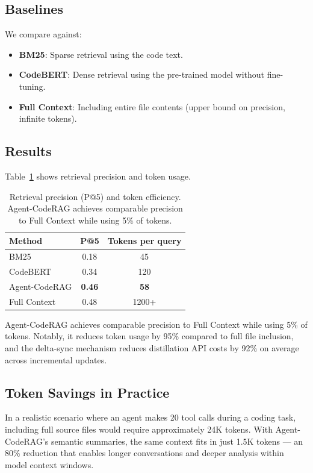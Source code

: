 \documentclass[10pt,twocolumn]{article}
\begin{document}
\subsection{Baselines}

We compare against:
\begin{itemize}
    \item \textbf{BM25}: Sparse retrieval using the code text.
    \item \textbf{CodeBERT}: Dense retrieval using the pre-trained model without fine-tuning.
    \item \textbf{Full Context}: Including entire file contents (upper bound on precision, infinite tokens).
\end{itemize}

\subsection{Results}

Table~\ref{tab:results} shows retrieval precision and token usage.

\begin{table}
    \centering
    \caption{Retrieval precision (P@5) and token efficiency. Agent-CodeRAG achieves comparable precision to Full Context while using 5\% of tokens.}
    \label{tab:results}
    \begin{tabular}{lcc}
        \toprule
        Method & P@5 & Tokens per query \\
        \midrule
        BM25 & 0.18 & 45 \\
        CodeBERT & 0.34 & 120 \\
        Agent-CodeRAG & \textbf{0.46} & \textbf{58} \\
        Full Context & 0.48 & 1200+ \\
        \bottomrule
    \end{tabular}
\end{table}

Agent-CodeRAG achieves comparable precision to Full Context while using 5\% of tokens. Notably, it reduces token usage by 95\% compared to full file inclusion, and the delta-sync mechanism reduces distillation API costs by 92\% on average across incremental updates.

\subsection{Token Savings in Practice}

In a realistic scenario where an agent makes 20 tool calls during a coding task, including full source files would require approximately 24K tokens. With Agent-CodeRAG's semantic summaries, the same context fits in just 1.5K tokens — an 80\% reduction that enables longer conversations and deeper analysis within model context windows.
\end{document}
